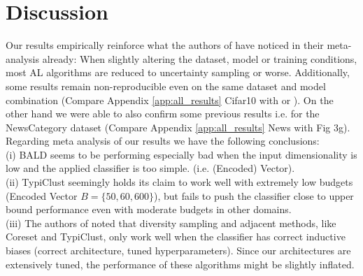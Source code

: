 \documentclass[]{article}
\begin{document}
\section{Discussion}
Our results empirically reinforce what the authors of \cite{zhou2021towards} have noticed in their meta-analysis already:
When slightly altering the dataset, model or training conditions, most AL algorithms are reduced to uncertainty sampling or worse.
Additionally, some results remain non-reproducible even on the same dataset and model combination (Compare Appendix \ref{app:all_results} Cifar10 with \cite{hacohen2022active} or \cite{sener2017active}).
On the other hand we were able to also confirm some previous results i.e. for the NewsCategory dataset (Compare Appendix \ref{app:all_results} News with \cite{hu2021towards} Fig 3g). \\ [1mm]
Regarding meta analysis of our results we have the following conclusions:\\
(i) BALD seems to be performing especially bad when the input dimensionality is low and the applied classifier is too simple. (i.e. (Encoded) Vector). \\
(ii) TypiClust seemingly holds its claim to work well with extremely low budgets (Encoded Vector $B=\{50,60,600\}$), but fails to push the classifier close to upper bound performance even with moderate budgets in other domains. \\
(iii) The authors of \cite{ashdeep} noted that diversity sampling and adjacent methods, like Coreset and TypiClust, only work well when the classifier has correct inductive biases (correct architecture, tuned hyperparameters). Since our architectures are extensively tuned, the performance of these algorithms might be slightly inflated.

\end{document}
